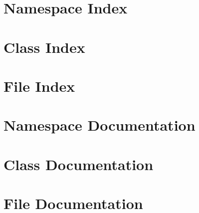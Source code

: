 \documentclass[twoside]{book}
\newcommand{\+}{\discretionary{\mbox{\scriptsize$\hookleftarrow$}}{}{}}
\newcommand{\clearemptydoublepage}{%
    \newpage{\pagestyle{empty}\cleardoublepage}%
  }
\begin{document}
\chapter{Namespace Index}

\chapter{Class Index}

\chapter{File Index}

\chapter{Namespace Documentation}


\chapter{Class Documentation}











\chapter{File Documentation}











  \backmatter
  \newpage
  \clearemptydoublepage
  \printindex
\end{document}
